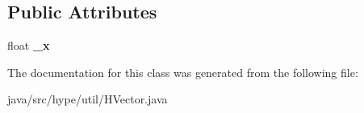 \subsection*{Public Attributes}
\begin{DoxyCompactItemize}
\item 
\hypertarget{classhype_1_1util_1_1_h_vector_a5869196c76b86b9a6ce2d65af1d34180}{float {\bfseries \-\_\-x}}\label{classhype_1_1util_1_1_h_vector_a5869196c76b86b9a6ce2d65af1d34180}

\end{DoxyCompactItemize}


The documentation for this class was generated from the following file\-:\begin{DoxyCompactItemize}
\item 
java/src/hype/util/H\-Vector.\-java\end{DoxyCompactItemize}
